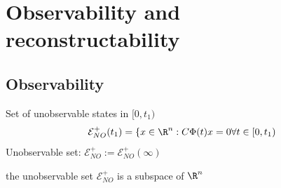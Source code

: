 \documentclass[english]{lectures}
\begin{document}
\chapter{Observability and reconstructability}
\section{Observability}
\begin{definition}
    Set of unobservable states in $[0,t_1)$
    \[
        \mathcal{E}^+_{NO}(t_1) = \{x\in \R^n : C\Phi(t)x=0 \forall t \in [0,t_1)
    \]
    Unobservable set: $\mathcal{E}^+_{NO}:=\mathcal{E}^+_{NO}(\infty)$
\end{definition}
\begin{result}
    the unobservable set $\mathcal{E}^+_{NO}$ is a subspace of $\R^n$
\end{result}
\end{document}
